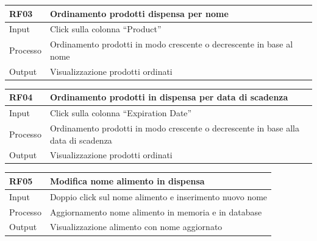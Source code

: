 \documentclass{article}
\begin{document}
\begin{table}[H]
    \begin{flushleft}
      \begin{tabular}{l|l}
        \toprule
        \textbf{RF03} & \textbf{Ordinamento prodotti dispensa per nome}\\
        \midrule
        Input & Click sulla colonna “Product”\\
        Processo & Ordinamento prodotti in modo crescente o decrescente in base al nome\\
        Output & Visualizzazione prodotti ordinati\\
        \bottomrule
      \end{tabular}
    \end{flushleft}
\end{table}

\begin{table}[H]
    \begin{flushleft}
      \begin{tabular}{l|l}
        \toprule
        \textbf{RF04} & \textbf{Ordinamento prodotti in dispensa per data di scadenza}\\
        \midrule
        Input & Click sulla colonna “Expiration Date”\\
        Processo & Ordinamento prodotti in modo crescente o decrescente in base alla data di scadenza\\
        Output & Visualizzazione prodotti ordinati\\
        \bottomrule
      \end{tabular}
    \end{flushleft}
\end{table}

\begin{table}[H]
    \begin{flushleft}
      \begin{tabular}{l|l}
        \toprule
        \textbf{RF05} & \textbf{Modifica nome alimento in dispensa}\\
        \midrule
        Input & Doppio click sul nome alimento e inserimento nuovo nome\\
        Processo & Aggiornamento nome alimento in memoria e in database\\
        Output & Visualizzazione alimento con nome aggiornato\\
        \bottomrule
      \end{tabular}
    \end{flushleft}
\end{table}
\end{document}
